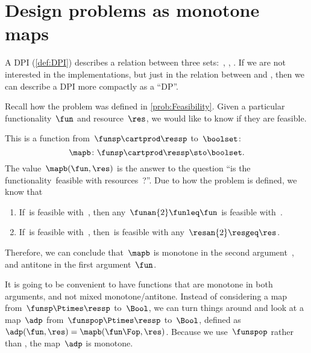 
\section[DPs as  monotone maps]{Design problems as  monotone maps}
\label{sec:dpdefinition}

A DPI (\cref{def:DPI}) describes a relation between three sets:~\funsp, \ressp, \impsp.
If we are not interested in the implementations, but just in the relation between \funsp and \ressp, then we can describe a DPI more compactly as a ``DP''\@.

Recall how the problem \Feasibility was defined in \cref{prob:Feasibility}.
Given a particular functionality~$\fun$ and resource~$\res$, we would like to know if they are feasible.

This is a function from~$\funsp \cartprod \ressp$ to~$\boolset$:
%
\begin{equation}
    \mapb\colon \funsp \cartprod \ressp \sto \boolset.
\end{equation}
%
The value~$\mapb(\fun, \res)$ is the answer to the question ``is the functionality~\fun feasible with resources~\res?''.
Due to how the problem is defined, we know that%
\begin{enumerate}
    \item If~\fun is feasible with~\res, then any~$\funan{2} \funleq \fun$ is feasible with~\res.
    \item If~\fun is feasible with~\res, then~\fun is feasible with any~$\resan{2} \resgeq \res$.
\end{enumerate}
Therefore, we can conclude that~$\mapb$ is monotone in the second argument~\res, and antitone in the first argument~$\fun$.

It is going to be convenient to have functions that are monotone in both arguments, and not mixed monotone/antitone.
Instead of considering a map from~$\funsp \Ptimes \ressp$ to~$\Bool$, we can turn things around and look at a map~$\adp$ from~$\funspop \Ptimes \ressp$ to~$\Bool$, defined as~$\adp(\fun,\res) = \mapb(\fun\Fop,\res)$.
Because we use~$\funspop$ rather than \funsp, the map~$\adp$ is monotone.


